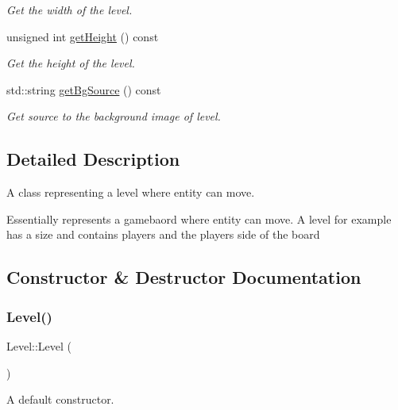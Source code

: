 \begin{DoxyCompactItemize}
\begin{DoxyCompactList}\small\item\em Get the width of the level. \end{DoxyCompactList}\item 
unsigned int \hyperlink{classLevel_a134002eee88eb3af6955241948309934}{get\+Height} () const
\begin{DoxyCompactList}\small\item\em Get the height of the level. \end{DoxyCompactList}\item 
std\+::string \hyperlink{classLevel_af7eb4bcc3f48dce1da830b4601cc8bb5}{get\+Bg\+Source} () const
\begin{DoxyCompactList}\small\item\em Get source to the background image of level. \end{DoxyCompactList}\end{DoxyCompactItemize}


\subsection{Detailed Description}
A class representing a level where entity can move. 

Essentially represents a gamebaord where entity can move. A level for example has a size and contains players and the player\textquotesingle{}s side of the board 

\subsection{Constructor \& Destructor Documentation}
\mbox{\label{classLevel_ac1c79fc13a67584d22e3d7295cd3cc9d}} 
\subsubsection{\texorpdfstring{Level()}{Level()}\hspace{0.1cm}{\footnotesize\ttfamily [1/2]}}
{\footnotesize\ttfamily Level\+::\+Level (\begin{DoxyParamCaption}{ }\end{DoxyParamCaption})\hspace{0.3cm}{\ttfamily [default]}}



A default constructor. 

